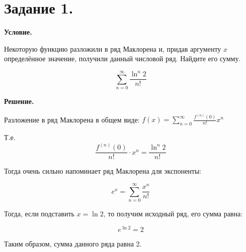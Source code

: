 \section{Задание 1.}

\textbf{Условие.}

Некоторую функцию разложили в ряд Маклорена и, придав аргументу $x$ определённое значение, получили 
данный числовой ряд. Найдите его сумму.

\[\sum_{n = 0}^\infty \frac{\ln^n 2}{n!}\]

\vspace{10mm}

\textbf{Решение.}

Разложение в ряд Маклорена в общем виде: 
$\displaystyle f(x) = \sum_{n = 0}^\infty \frac{f^{(n)}(0)}{n!} x^n$

Т.е. 
\[\displaystyle \frac{f^{(n)}(0)}{n!}  \cdot x^n = \frac{\ln^n 2}{n!}\]

Тогда очень сильно напоминает ряд Маклорена для экспоненты:

\[\displaystyle e^x = \sum_{n = 0}^\infty \frac{x^n}{n!}\]

Тогда, если подставить $x = \ln 2$, то получим исходный ряд, его сумма равна:

\[\displaystyle e^{\ln 2} = 2\]

Таким образом, сумма данного ряда равна 2.

\clearpage
